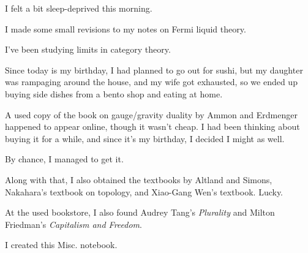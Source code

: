 \documentclass[uplatex]{jsarticle}
\begin{document}
I felt a bit sleep-deprived this morning.

I made some small revisions to my notes on Fermi liquid theory.

I've been studying limits in category theory.

Since today is my birthday, I had planned to go out for sushi,  
but my daughter was rampaging around the house, and my wife got exhausted,  
so we ended up buying side dishes from a bento shop and eating at home.

A used copy of the book on gauge/gravity duality by Ammon and Erdmenger happened to appear online, though it wasn't cheap.  
I had been thinking about buying it for a while, and since it's my birthday, I decided I might as well.

By chance, I managed to get it.

Along with that, I also obtained the textbooks by Altland and Simons,  
Nakahara's textbook on topology, and Xiao-Gang Wen's textbook.  
Lucky.

At the used bookstore, I also found Audrey Tang's \textit{Plurality}  
and Milton Friedman's \textit{Capitalism and Freedom}.

I created this Misc. notebook.
\end{document}

